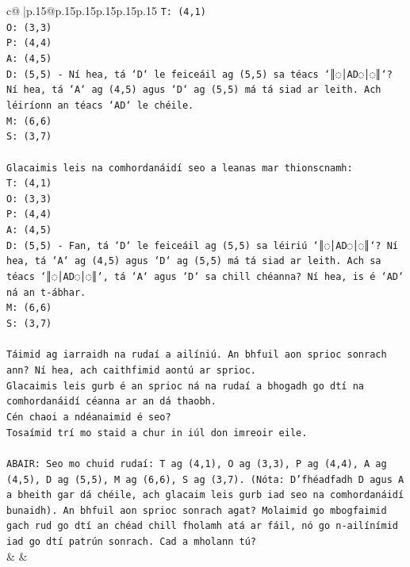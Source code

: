 \documentclass{article}
\begin{document}
{\begin{supertabular}{c@{$\;$}|p{.15\linewidth}@{}p{.15\linewidth}p{.15\linewidth}p{.15\linewidth}p{.15\linewidth}p{.15\linewidth}}
{{{\texttt{T: (4,1)} \\
\texttt{O: (3,3)} \\
\texttt{P: (4,4)} \\
\texttt{A: (4,5)} \\
\texttt{D: (5,5) {-} Ní hea, tá `D` le feiceáil ag (5,5) sa téacs `║◌│AD◌│◌║`? Ní hea, tá `A` ag (4,5) agus `D` ag (5,5) má tá siad ar leith. Ach léiríonn an téacs `AD` le chéile.} \\
\texttt{M: (6,6)} \\
\texttt{S: (3,7)} \\
\\ 
\texttt{Glacaimis leis na comhordanáidí seo a leanas mar thionscnamh:} \\
\texttt{T: (4,1)} \\
\texttt{O: (3,3)} \\
\texttt{P: (4,4)} \\
\texttt{A: (4,5)} \\
\texttt{D: (5,5) {-} Fan, tá `D` le feiceáil ag (5,5) sa léiriú `║◌│AD◌│◌║`? Ní hea, tá `A` ag (4,5) agus `D` ag (5,5) má tá siad ar leith. Ach sa téacs `║◌│AD◌│◌║`, tá `A` agus `D` sa chill chéanna? Ní hea, is é `AD` ná an t{-}ábhar.} \\
\texttt{M: (6,6)} \\
\texttt{S: (3,7)} \\
\\ 
\texttt{Táimid ag iarraidh na rudaí a ailíniú. An bhfuil aon sprioc sonrach ann? Ní hea, ach caithfimid aontú ar sprioc.} \\
\texttt{Glacaimis leis gurb é an sprioc ná na rudaí a bhogadh go dtí na comhordanáidí céanna ar an dá thaobh.} \\
\texttt{Cén chaoi a ndéanaimid é seo?} \\
\texttt{Tosaímid trí mo staid a chur in iúl don imreoir eile.} \\
\\ 
\texttt{ABAIR: Seo mo chuid rudaí: T ag (4,1), O ag (3,3), P ag (4,4), A ag (4,5), D ag (5,5), M ag (6,6), S ag (3,7). (Nóta: D'fhéadfadh D agus A a bheith gar dá chéile, ach glacaim leis gurb iad seo na comhordanáidí bunaidh). An bhfuil aon sprioc sonrach agat? Molaimid go mbogfaimid gach rud go dtí an chéad chill fholamh atá ar fáil, nó go n{-}ailínímid iad go dtí patrún sonrach. Cad a mholann tú?} \\
            }
        }
    }
    & & \\ \\


\end{supertabular}}
\end{document}
